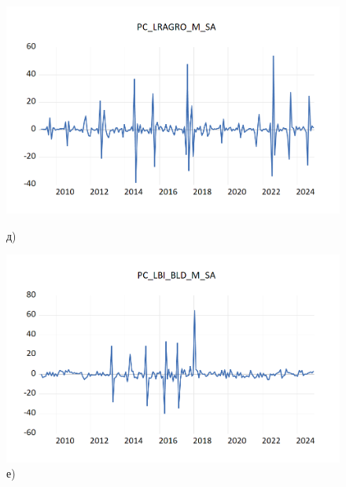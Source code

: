 \documentclass[a4paper, 14pt]{extreport}
\numberwithin{equation}{section}
\numberwithin{equation}{section}
\begin{document}
\begin{figure}[h!]
		\begin{minipage}{0.5\textwidth}
			\centering
			\includegraphics[scale=0.4]{images/image26}
			\caption*{д)}
		\end{minipage}%
		\hfill %
		\begin{minipage}{0.5\textwidth}
			\centering
			\includegraphics[scale=0.4]{images/image27}
			\caption*{е)}
		\end{minipage}
		

\end{figure}
\end{document}
